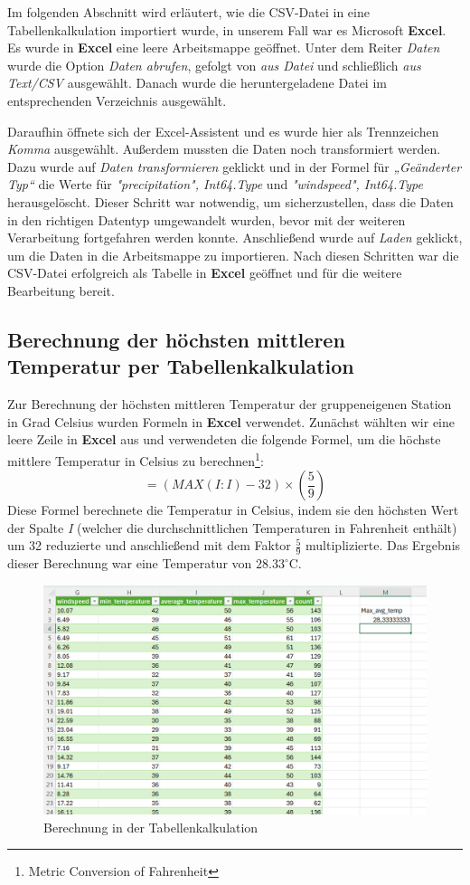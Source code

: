 \documentclass{article}
\begin{document}
Im folgenden Abschnitt wird erläutert, wie die CSV-Datei in eine Tabellenkalkulation importiert wurde, in unserem Fall war es Microsoft \textbf{Excel}. Es wurde in \textbf{Excel} eine leere Arbeitsmappe geöffnet. Unter dem Reiter \textit{Daten} wurde die Option \textit{Daten abrufen}, gefolgt von \textit{aus Datei} und schließlich \textit{aus Text/CSV} ausgewählt. Danach wurde die heruntergeladene Datei im entsprechenden Verzeichnis ausgewählt. 

Daraufhin öffnete sich der Excel-Assistent und es wurde hier als Trennzeichen \textit{Komma} ausgewählt.
Außerdem mussten die Daten noch transformiert werden. Dazu wurde auf \textit{Daten transformieren} geklickt und in der Formel für \textit{„Geänderter Typ“} die Werte für \textit{{"precipitation", Int64.Type}} und \textit{{"windspeed", Int64.Type}} herausgelöscht. Dieser Schritt war notwendig, um sicherzustellen, dass die Daten in den richtigen Datentyp umgewandelt wurden, bevor mit der weiteren Verarbeitung fortgefahren werden konnte. Anschließend wurde auf \textit{Laden} geklickt, um die Daten in die Arbeitsmappe zu importieren. Nach diesen Schritten war die CSV-Datei erfolgreich als Tabelle in \textbf{Excel} geöffnet und für die weitere Bearbeitung bereit.

\subsection{Berechnung der höchsten mittleren Temperatur per Tabellenkalkulation}

Zur Berechnung der höchsten mittleren Temperatur der gruppeneigenen Station in Grad Celsius wurden Formeln in \textbf{Excel} verwendet. Zunächst wählten wir eine leere Zeile in \textbf{Excel} aus und verwendeten die folgende Formel, um die höchste mittlere Temperatur in Celsius zu berechnen\footnote{Metric Conversion of Fahrenheit\cite{metric_conversions_fahrenheit}}:
\[
=(MAX(I:I)-32) \times \left(\frac{5}{9}\right)
\]
Diese Formel berechnete die Temperatur in Celsius, indem sie den höchsten Wert der Spalte \textit{I} (welcher die durchschnittlichen Temperaturen in Fahrenheit enthält) um 32 reduzierte und anschließend mit dem Faktor \(\frac{5}{9}\) multiplizierte. Das Ergebnis dieser Berechnung war eine Temperatur von $28.33^\circ\text{C}$. 
\begin{figure}[ht] 
    \centering
    \includegraphics[width = \textwidth]{Screenshot 2024-11-25 111035.png}
    \caption{Berechnung in der Tabellenkalkulation}
    \label{fig:dax}
\end{figure}
\newpage
\end{document}
